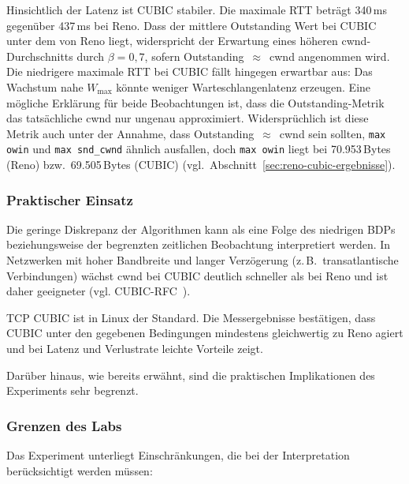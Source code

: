 Hinsichtlich der Latenz ist CUBIC stabiler. Die maximale RTT beträgt 340\,ms gegenüber 437\,ms bei Reno.
Dass der mittlere Outstanding Wert bei CUBIC unter dem von Reno liegt, widerspricht der Erwartung eines höheren cwnd-Durchschnitts durch $\beta = 0{,}7$, sofern Outstanding~$\approx$~cwnd angenommen wird.
Die niedrigere maximale RTT bei CUBIC fällt hingegen erwartbar aus: Das Wachstum nahe $W_{\max}$ könnte weniger Warteschlangenlatenz erzeugen.
Eine mögliche Erklärung für beide Beobachtungen ist, dass die Outstanding-Metrik das tatsächliche cwnd nur ungenau approximiert.
Widersprüchlich ist diese Metrik auch unter der Annahme, dass Outstanding~$\approx$~cwnd sein sollten, \texttt{max owin} und \texttt{max snd\_cwnd} ähnlich ausfallen, doch \texttt{max owin} liegt bei 70.953\,Bytes (Reno) bzw.\ 69.505\,Bytes (CUBIC) (vgl.\ Abschnitt~\ref{sec:reno-cubic-ergebnisse}).

\subsubsection{Praktischer Einsatz}

Die geringe Diskrepanz der Algorithmen kann als eine Folge des niedrigen BDPs beziehungsweise der begrenzten zeitlichen Beobachtung interpretiert werden.
In Netzwerken mit hoher Bandbreite und langer Verzögerung (z.\,B.\ transatlantische Verbindungen) wächst cwnd bei CUBIC deutlich schneller als bei Reno und ist daher geeigneter (vgl. CUBIC-RFC~\cite{tcp_cubic}).

TCP CUBIC ist in Linux der Standard.
Die Messergebnisse bestätigen, dass CUBIC unter den gegebenen Bedingungen mindestens gleichwertig zu Reno agiert und bei Latenz und Verlustrate leichte Vorteile zeigt.

Darüber hinaus, wie bereits erwähnt, sind die praktischen Implikationen des Experiments sehr begrenzt.

\subsubsection{Grenzen des Labs}

Das Experiment unterliegt Einschränkungen, die bei der Interpretation berücksichtigt werden müssen:

